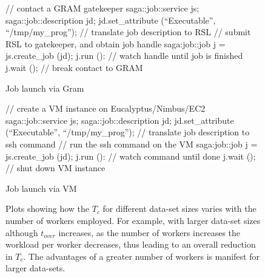 \documentclass[conference,final]{IEEEtran}
\newcommand{\tc }{ $T_c$ }
\newcommand{\upp}{\vspace*{-0.5em}}
\begin{document}
\begin{figure}[!ht]
\upp 
 \begin{center}
  \begin{mycode}[label=SAGA Job Launch via GRAM gatekeeper]
  { // contact a GRAM gatekeeper
    saga::job::service     js;
    saga::job::description jd;
    jd.set_attribute (``Executable'', ``/tmp/my_prog'');
    // translate job description to RSL
    // submit RSL to gatekeeper, and obtain job handle
    saga:job::job j = js.create_job (jd);
    j.run ():
    // watch handle until job is finished
    j.wait ();
   } // break contact to GRAM
  \end{mycode}
  \caption{\label{gramjob}Job launch via Gram }
 \end{center}
\upp
\end{figure}

\begin{figure}[!ht]
\upp
 \begin{center}
  \begin{mycode}[label=SAGA create a VM instance on a Cloud]
   {// create a VM instance on Eucalyptus/Nimbus/EC2
    saga::job::service     js;
    saga::job::description jd;
    jd.set_attribute (``Executable'', ``/tmp/my_prog'');
    // translate job description to ssh command
    // run the ssh command on the VM
    saga:job::job j = js.create_job (jd);
    j.run ():
    // watch command until done
    j.wait ();
   } // shut down VM instance
  \end{mycode}
  \caption{\label{vmjob} Job launch via VM}
 \end{center}
\upp
\end{figure}

\begin{figure}[t]
  \caption{Plots showing how the \tc for different data-set sizes
    varies with the number of workers employed.  For example, with
    larger data-set sizes although $t_{over}$ increases, as the number
    of workers increases the workload per worker decreases, thus
    leading to an overall reduction in $T_c$. The advantages of a
    greater number of workers is manifest for larger data-sets.}
\label{grids1}
\end{figure}
\end{document}
